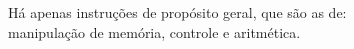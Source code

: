 \documentclass[preview]{standalone}
\begin{document}
Há apenas instruções de propósito geral, que são as de: \\ manipulação de memória, controle e aritmética.\\
\end{document}
